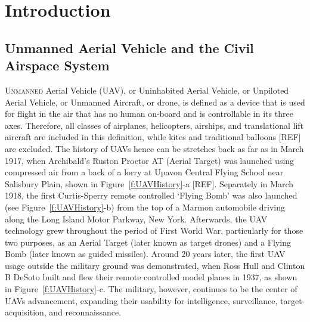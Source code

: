 \chapter{Introduction}
\label{Ch:Introduction}

\section{Unmanned Aerial Vehicle and the Civil Airspace System}
\label{S:UAVandCivilAirspace}

\lettrine[lines=3, nindent=0pt]{U}{nmanned} Aerial Vehicle (UAV), or Uninhabited Aerial Vehicle, or Unpiloted Aerial Vehicle, or Unmanned Aircraft, or drone, is defined as a device that is used for flight in the air that has no human on-board and is controllable in its three axes. Therefore, all classes of airplanes, helicopters, airships, and translational lift aircraft are included in this definition, while kites and traditional balloons [REF] are excluded. The history of UAVs hence can be stretches back as far as in March 1917, when Archibald’s Ruston Proctor AT (Aerial Target) was launched using compressed air from a back of a lorry at Upavon Central Flying School near Salisbury Plain, shown in Figure~\ref{f:UAVHistory}-a [REF]. Separately in March 1918, the first Curtis-Sperry remote controlled ‘Flying Bomb’ was also launched (see Figure~\ref{f:UAVHistory}-b) from the top of a Marmon automobile driving along the Long Island Motor Parkway, New York. Afterwards, the UAV technology grew throughout the period of First World War, particularly for those two purposes, as an Aerial Target (later known as target drones) and a Flying Bomb (later known as guided missiles). Around 20 years later, the first UAV usage outside the military ground was demonstrated, when Ross Hull and Clinton B DeSoto built and flew their remote controlled model planes in 1937, as shown in Figure~\ref{f:UAVHistory}-c. The military, however, continues to be the center of UAVs advancement, expanding their usability for intelligence, surveillance, target-acquisition, and reconnaissance.

